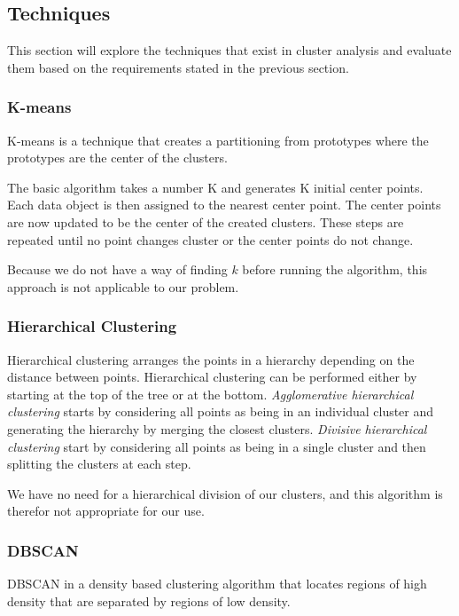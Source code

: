 \subsection{Techniques}
This section will explore the techniques that exist in cluster analysis and evaluate them based on the requirements stated in the previous section.

\subsubsection{K-means}
K-means is a technique that creates a partitioning from prototypes where the prototypes are the center of the clusters.

The basic algorithm takes a number K and generates K initial center points.
Each data object is then assigned to the nearest center point.
The center points are now updated to be the center of the created clusters.
These steps are repeated until no point changes cluster or the center points do not change.

Because we do not have a way of finding $ k $ before running the algorithm, this approach is not applicable to our problem.

\subsubsection{Hierarchical Clustering}
Hierarchical clustering arranges the points in a hierarchy depending on the distance between points.
Hierarchical clustering can be performed either by starting at the top of the tree or at the bottom.
\textit{Agglomerative hierarchical clustering} starts by considering all points as being in an individual cluster and generating the hierarchy by merging the closest clusters. 
\textit{Divisive hierarchical clustering} start by considering all points as being in a single cluster and then splitting the clusters at each step.

We have no need for a hierarchical division of our clusters, and this algorithm is therefor not appropriate for our use.

\subsubsection{DBSCAN}\label{clustering:DBSCAN}
DBSCAN in a density based clustering algorithm that locates regions of high density that are separated by regions of low density.

